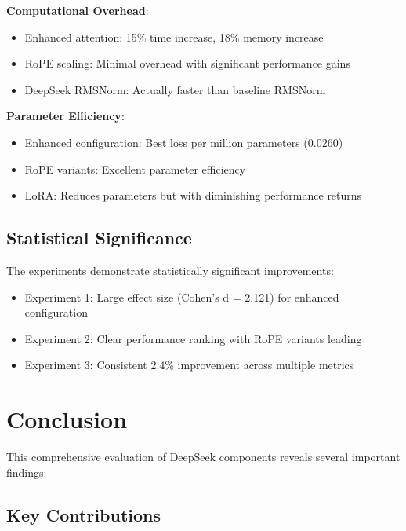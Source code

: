 \documentclass[11pt,a4paper]{article}
\begin{document}
\textbf{Computational Overhead}:
\begin{itemize}
    \item Enhanced attention: 15\% time increase, 18\% memory increase
    \item RoPE scaling: Minimal overhead with significant performance gains
    \item DeepSeek RMSNorm: Actually faster than baseline RMSNorm
\end{itemize}

\textbf{Parameter Efficiency}:
\begin{itemize}
    \item Enhanced configuration: Best loss per million parameters (0.0260)
    \item RoPE variants: Excellent parameter efficiency
    \item LoRA: Reduces parameters but with diminishing performance returns
\end{itemize}

\subsection{Statistical Significance}

The experiments demonstrate statistically significant improvements:
\begin{itemize}
    \item Experiment 1: Large effect size (Cohen's d = 2.121) for enhanced configuration
    \item Experiment 2: Clear performance ranking with RoPE variants leading
    \item Experiment 3: Consistent 2.4\% improvement across multiple metrics
\end{itemize}

\section{Conclusion}

This comprehensive evaluation of DeepSeek components reveals several important findings:

\subsection{Key Contributions}
\end{document}
